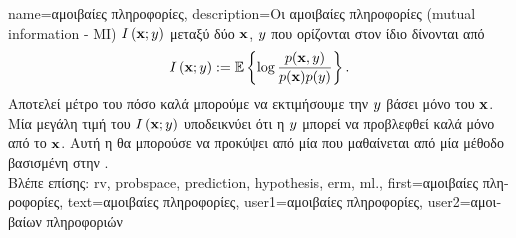 {name={\foreignlanguage{greek}{αμοιβαίες πληροφορίες}},
	description={\foreignlanguage{greek}{Οι} 
		\foreignlanguage{greek}{αμοιβαίες πληροφορίες} (mutual information - MI) $I \left( {\bf x};y\right)$ 
 		\foreignlanguage{greek}{μεταξύ δύο}  ${\bf x}$, $y$ \foreignlanguage{greek}{που ορίζονται στον ίδιο} 
		 \foreignlanguage{greek}{δίνονται από}
 		\cite{coverthomas} $$I \left( {\bf x};y\right) := 
		\mathbb{E} \left\{ \log \frac{p ({\bf x},y)}{p({\bf x})p(y)} \right\}.$$ 
		\foreignlanguage{greek}{Αποτελεί μέτρο του πόσο καλά μπορούμε να εκτιμήσουμε την} $y$ \foreignlanguage{greek}{βάσει 
		μόνο του} ${\bf x}$. \foreignlanguage{greek}{Μία μεγάλη τιμή του} $I \left( {\bf x};y\right)$ 
		\foreignlanguage{greek}{υποδεικνύει ότι η} $y$ \foreignlanguage{greek}{μπο\-ρεί να προβλεφθεί καλά μόνο από το} ${\bf x}$. 
		\foreignlanguage{greek}{Αυτή η}  \foreignlanguage{greek}{θα μπορούσε να προκύψει από μία} 
		 \foreignlanguage{greek}{που μαθαίνεται από μία μέθοδο}  
		\foreignlanguage{greek}{βασισμένη στην} .\\
		\foreignlanguage{greek}{Βλέπε επίσης:} \gls{rv}, \gls{probspace}, \gls{prediction}, \gls{hypothesis}, \gls{erm}, \gls{ml}.}, 
	first={\foreignlanguage{greek}{αμοιβαίες πληροφορίες}}, 
	text={\foreignlanguage{greek}{αμοιβαίες πληροφορίες}},
	user1={\foreignlanguage{greek}{αμοιβαίες πληροφορίες}}, %
	user2={\foreignlanguage{greek}{αμοιβαίων πληροφοριών}} %
}
        
